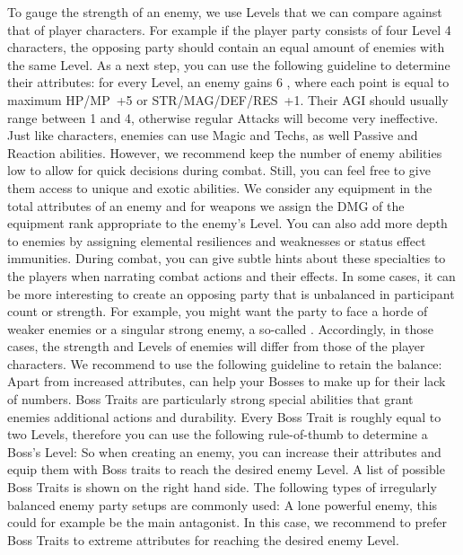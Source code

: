 To gauge the strength of an enemy, we use Levels that we can compare against that of player characters.
For example if the player party consists of four Level 4 characters, the opposing party should contain an equal amount of enemies with the same Level.
As a next step, you can use the following guideline to determine their attributes: 
for every Level, an enemy gains 6 , where each point is equal to maximum HP/MP~+5 or STR/MAG/DEF/RES~+1.
Their AGI should usually range between 1 and 4, otherwise regular Attacks will become very ineffective.
Just like characters, enemies can use Magic and Techs, as well Passive and Reaction abilities.
However, we recommend keep the number of enemy abilities low to allow for quick decisions during combat.
Still, you can feel free to give them access to unique and exotic abilities.
We consider any equipment in the total attributes of an enemy and for weapons we assign the DMG of the equipment rank appropriate to the enemy's Level.
You can also add more depth to enemies by assigning elemental resiliences and weaknesses or status effect immunities.
During combat, you can give subtle hints about these specialties to the players when narrating combat actions and their effects.
%
\vfill
%
In some cases, it can be more interesting to create an opposing party that is unbalanced in participant count or strength.
For example, you might want the party to face a horde of weaker enemies or a singular strong enemy, a so-called .
Accordingly, in those cases, the strength and Levels of enemies will differ from those of the player characters.
We recommend to use the following guideline to retain the balance:\ofrow
{}\ofrow
Apart from increased attributes,  can help your Bosses to make up for their lack of numbers.
Boss Traits are particularly strong special abilities that grant enemies additional actions and durability. 
Every Boss Trait is roughly equal to two Levels, therefore you can use the following rule-of-thumb to determine a Boss's Level:\ofrow
{}\ofrow
So when creating an enemy, you can increase their attributes and equip them with Boss traits to reach the desired enemy Level.
A list of possible Boss Traits is shown on the right hand side.
%
\vfill
%
The following types of irregularly balanced enemy party setups are commonly used:
\ofrow
{}
A lone powerful enemy, this could for example be the main antagonist. 
In this case, we recommend to prefer Boss Traits to extreme attributes for reaching the desired enemy Level.

